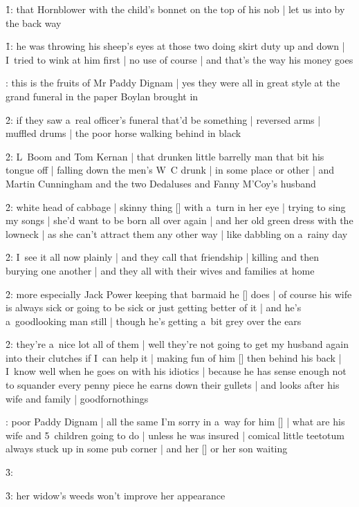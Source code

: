 \f1:
that Hornblower with the child's bonnet on the top of his nob |
let us into by the back way

\f1:
he was throwing his sheep's eyes at those two doing skirt duty up and down |
I~tried to wink at him first |
no use of course |
and that's the way his money goes

:
this is the fruits of Mr Paddy Dignam |
yes they were all in great style at the grand funeral
in the paper Boylan brought in

\f2:
if they saw a~real officer's funeral that'd be something |
reversed arms |
muffled drums |
the poor horse walking behind in black

\f2:
L~Boom and Tom Kernan |
that drunken little barrelly man that bit his tongue off |
falling down the men's W~C drunk |
in some place or other |
and Martin Cunningham and the two Dedaluses and Fanny M'Coy's husband

\f2:
white head of cabbage |
skinny thing [\fanny] with a~turn in her eye |
trying to sing my songs |
she'd want to be born all over again |
and her old green dress with the lowneck |
as she can't attract them any other way |
like dabbling on a~rainy day

\f2:
I~see it all now plainly |
and they call that friendship |
killing and then burying one another |
and they all with their wives and families at home

\f2:
more especially Jack Power keeping that barmaid he [\power] does |
of course his wife is always sick or going to be sick or just getting better of it |
and he's a~goodlooking man still |
though he's getting a~bit grey over the ears

\f2:
they're a~nice lot all of them |
well they're not going to get my husband again into their clutches
if I~can help it |
making fun of him [\bloom] then behind his back |
I~know well when he goes on with his idiotics |
because he has sense enough
not to squander every penny piece he earns down their gullets |
and looks after his wife and family |
goodfornothings

:
poor Paddy Dignam |
all the same I'm sorry in a~way for him [\dignam] |
what are his wife and 5~children going to do |
unless he was insured |
comical little teetotum always stuck up in some pub corner |
and her [\mrsdignam] or her son waiting

\f3:

\f3:
her widow's weeds won't improve her appearance

